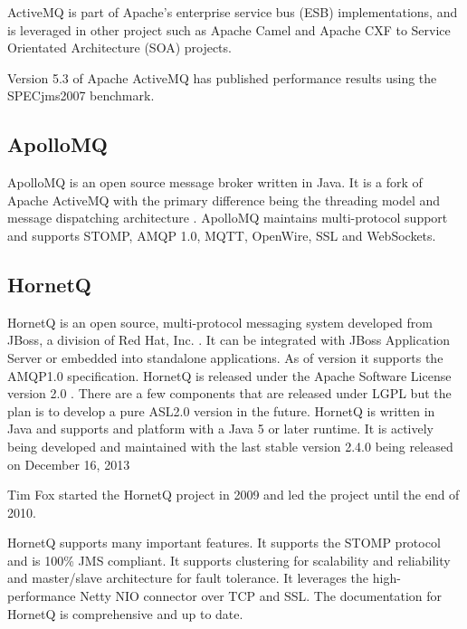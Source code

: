 \documentclass{thesis}
\begin{document}
ActiveMQ is part of Apache's enterprise service bus (ESB) implementations, and is leveraged in other project such as Apache Camel and Apache CXF to Service Orientated Architecture (SOA) projects.

Version 5.3 of Apache ActiveMQ has published performance results using the SPECjms2007 benchmark.  


\subsection{ApolloMQ}
ApolloMQ is an open source message broker written in Java.  It is a fork of Apache ActiveMQ with the primary difference being the threading model and message dispatching architecture .  ApolloMQ maintains multi-protocol support and supports STOMP, AMQP 1.0, MQTT, OpenWire, SSL and WebSockets.

\subsection{HornetQ}
HornetQ is an open source, multi-protocol messaging system developed from JBoss, a division of Red Hat, Inc. \cite{http://en.wikipedia.org/wiki/JBoss_(company)}.  It can be integrated with JBoss Application Server or embedded into standalone applications.  As of version  it supports the AMQP1.0 specification.  HornetQ is released under the Apache Software License version 2.0 .  There are a few components that are released under LGPL  but the plan is to develop a pure ASL2.0 version in the future.  HornetQ is written in Java and supports and platform with a Java 5 or later runtime.   It is actively being developed and maintained with the last stable version 2.4.0 being released on December 16, 2013 


Tim Fox started the HornetQ project in 2009 and led the project until the end of 2010. 

HornetQ supports many important features.  It supports the STOMP  protocol and is 100\% JMS compliant.  It supports clustering for scalability and reliability and master/slave architecture for fault tolerance.  It leverages the high-performance Netty NIO connector over TCP and SSL.  The documentation for HornetQ is comprehensive and up to date.  
\end{document}
